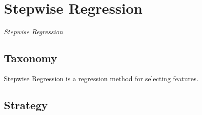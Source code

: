 
\section{Stepwise Regression} 
\label{sec:stepwise}

\emph{Stepwise Regression}

\subsection{Taxonomy}
Stepwise Regression is a regression method for selecting features.


\subsection{Strategy}

